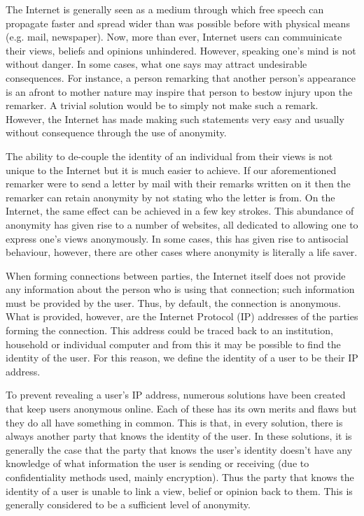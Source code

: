 \documentclass[ %
                    author={Luke Murray},
                supervisor={Dr. Simon Hollis},
                     title={Shadow Peer-to-Peer Networks},
                  subtitle={},
                    degree={MEng},
                      year={2013} ]{thesis}
\begin{document}
The Internet is generally seen as a medium through which free speech can propagate faster and spread wider than was possible before with physical means (e.g. mail, newspaper). Now, more than ever, Internet users can commuinicate their views, beliefs and opinions unhindered. However, speaking one's mind is not without danger. In some cases, what one says may attract undesirable consequences. For instance, a person remarking that another person's appearance is an afront to mother nature may inspire that person to bestow injury upon the remarker. A trivial solution would be to simply not make such a remark. However, the Internet has made making such statements very easy and usually without consequence through the use of anonymity.

The ability to de-couple the identity of an individual from their views is not unique to the Internet but it is much easier to achieve. If our aforementioned remarker were to send a letter by mail with their remarks written on it then the remarker can retain anonymity by not stating who the letter is from. On the Internet, the same effect can be achieved in a few key strokes. This abundance of anonymity has given rise to a number of websites, all dedicated to allowing one to express one's views anonymously. In some cases, this has given rise to antisocial behaviour, however, there are other cases where anonymity is literally a life saver.

When forming connections between parties, the Internet itself does not provide any information about the person who is using that connection; such information must be provided by the user. Thus, by default, the connection is anonymous. What is provided, however, are the Internet Protocol (IP) addresses of the parties forming the connection. This address could be traced back to an institution, household or individual computer and from this it may be possible to find the identity of the user. For this reason, we define the identity of a user to be their IP address. 

To prevent revealing a user's IP address, numerous solutions have been created that keep users anonymous online. Each of these has its own merits and flaws but they do all have something in common. This is that, in every solution, there is always another party that knows the identity of the user. In these solutions, it is generally the case that the party that knows the user's identity doesn't have any knowledge of what information the user is sending or receiving (due to confidentiality methods used, mainly encryption). Thus the party that knows the identity of a user is unable to link a view, belief or opinion back to them. This is generally considered to be a sufficient level of anonymity.
\end{document}
